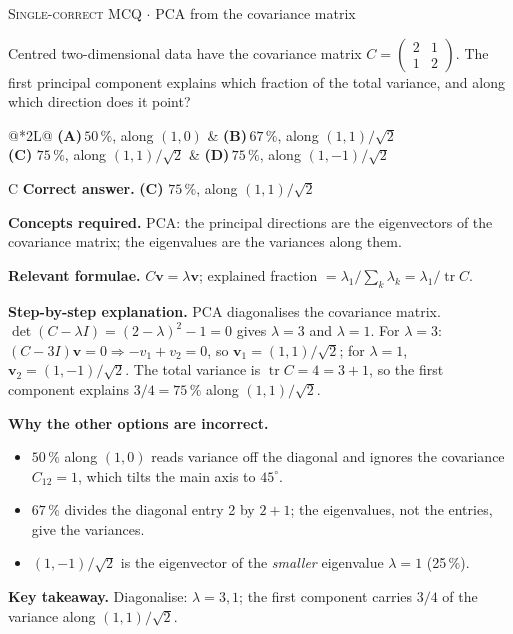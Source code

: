 \documentclass[11pt,a4paper]{article}
\newcommand{\optlabel}[1]{\textbf{(#1)}}
\newcommand{\correctlabel}[1]{\textcolor{okgreen}{\textbf{(#1)}\,\ding{51}}}
\newenvironment{qitem}[1]{\begin{list}{}{\setlength{\leftmargin}{3.3em}\setlength{\labelwidth}{3.1em}%
  \setlength{\labelsep}{0.2em}\setlength{\topsep}{3pt}\setlength{\parsep}{3pt}}\item[\textbf{Q.#1}\hfill]}{\end{list}}
\newcommand{\qsep}{\par\vspace{2pt}{\color{black!15}\hrule}\vspace{4pt}}
\newcommand{\qmeta}[2]{{\footnotesize\color{black!60}\textsc{#1} \;$\cdot$\; #2}\par}
\begin{document}
\begin{qitem}{4}
\qmeta{Single-correct MCQ}{PCA from the covariance matrix}
Centred two-dimensional data have the covariance matrix $C = \begin{pmatrix}2 & 1\\ 1 & 2\end{pmatrix}$. The first
principal component explains which fraction of the total variance, and along which direction does it point?
\par\smallskip\noindent\begin{tabularx}{\linewidth}{@{}*{2}{L}@{}}
\optlabel{A}\,$50\,\%$, along $(1, 0)$ & \optlabel{B}\,$67\,\%$, along $(1, 1)/\sqrt2$ \\[3pt]
\correctlabel{C}\,$75\,\%$, along $(1, 1)/\sqrt2$ & \optlabel{D}\,$75\,\%$, along $(1, -1)/\sqrt2$
\end{tabularx}
\end{qitem}
\begin{solbox}{C}
\textbf{\color{brand}Correct answer.} \textcolor{okgreen}{\textbf{(C)}} $75\,\%$, along $(1, 1)/\sqrt2$

\textbf{\color{brand}Concepts required.} PCA: the principal directions are the eigenvectors of the covariance matrix; the eigenvalues are the variances along them.

\textbf{\color{brand}Relevant formulae.} $C\mathbf v = \lambda\mathbf v$; explained fraction $= \lambda_1/\sum_k\lambda_k = \lambda_1/\operatorname{tr}C$.

\textbf{\color{brand}Step-by-step explanation.} PCA diagonalises the covariance matrix. $\det(C - \lambda I) = (2 - \lambda)^2 - 1 = 0$ gives $\lambda = 3$ and $\lambda = 1$.
For $\lambda = 3$: $(C - 3I)\mathbf v = 0 \Rightarrow -v_1 + v_2 = 0$, so $\mathbf v_1 = (1, 1)/\sqrt2$; for $\lambda = 1$, $\mathbf v_2 = (1, -1)/\sqrt2$.
The total variance is $\operatorname{tr} C = 4 = 3 + 1$, so the first component explains $3/4 = 75\,\%$ along $(1, 1)/\sqrt2$.

\textbf{\color{brand}Why the other options are incorrect.}
\begin{itemize}[leftmargin=2.4em, itemsep=1pt, topsep=2pt]
\item[\textbf{(A)}] $50\,\%$ along $(1, 0)$ reads variance off the diagonal and ignores the covariance $C_{12} = 1$, which tilts the main axis to $45^\circ$.
\item[\textbf{(B)}] $67\,\%$ divides the diagonal entry 2 by $2 + 1$; the eigenvalues, not the entries, give the variances.
\item[\textbf{(D)}] $(1, -1)/\sqrt2$ is the eigenvector of the \emph{smaller} eigenvalue $\lambda = 1$ (25\,\%).
\end{itemize}
\textbf{\color{brand}Key takeaway.} Diagonalise: $\lambda = 3, 1$; the first component carries $3/4$ of the variance along $(1,1)/\sqrt2$.
\end{solbox}
\qsep
\end{document}
